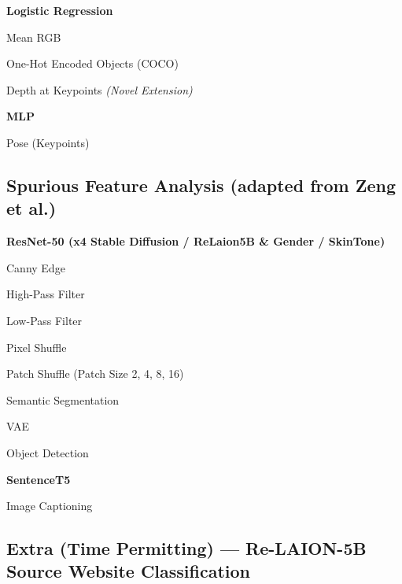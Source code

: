 \documentclass{article}
\newcommand{\todo}{\textcolor{red}{$\square$}}          %
\begin{document}
	\textbf{Logistic Regression}
	\begin{checklist}
		\item[\todo] Mean RGB
		\item[\todo] One-Hot Encoded Objects (COCO)
		\item[\todo] Depth at Keypoints \textit{(Novel Extension)}
	\end{checklist}
	
	\textbf{MLP}
	\begin{checklist}
		\item[\todo] Pose (Keypoints)
	\end{checklist}
	
	\subsection*{Spurious Feature Analysis (adapted from Zeng et al.)}
	
	\textbf{ResNet-50 (x4 Stable Diffusion / ReLaion5B \& Gender / SkinTone)}
	\begin{checklist}
		\item[\todo] Canny Edge
		\item[\todo] High-Pass Filter
		\item[\todo] Low-Pass Filter
		\item[\todo] Pixel Shuffle
		\item[\todo] Patch Shuffle (Patch Size 2, 4, 8, 16)
		\item[\todo] Semantic Segmentation
		\item[\todo] VAE
		\item[\todo] Object Detection
	\end{checklist}
	
	\textbf{SentenceT5}
	\begin{checklist}
		\item[\todo] Image Captioning
	\end{checklist}
	
	\newpage
	\subsection*{Extra (Time Permitting) --- Re-LAION-5B Source Website Classification}
	
\end{document}
